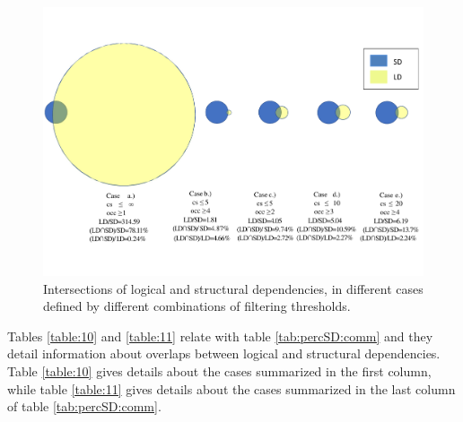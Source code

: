 \documentclass[a4paper,twoside]{article}
\begin{document}
\begin{figure}[!t]
\centering
\includegraphics[width=5.7in]{figvenn.pdf}
\vspace{-1cm}
\caption{Intersections of logical and structural dependencies, in different cases defined by different combinations of filtering thresholds. }
\label{fig_venn}
\end{figure}




Tables \ref{table:10} and \ref{table:11} relate with table \ref{tab:percSD:comm} and they detail information about overlaps between logical and structural dependencies. Table \ref{table:10} gives details about the cases summarized in the first column, while table \ref{table:11} gives details about the cases summarized in the last column of table \ref{tab:percSD:comm}.
  
\end{document}
